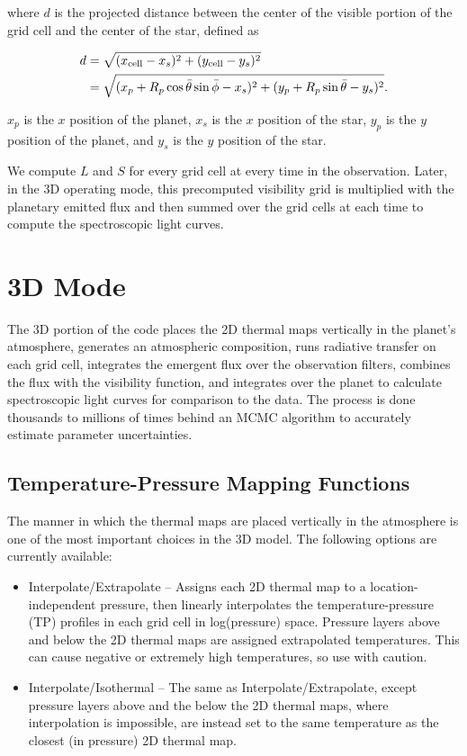 \documentclass[12pt]{article}
\begin{document}
\noindent
where $d$ is the projected distance between the center of the visible
portion of the grid cell and the center of the star, defined as

\begin{align}
  d &= \sqrt{(x_{\rm cell} - x_s)^2 + (y_{\rm cell} - y_s)^2} \\
  &= \sqrt{(x_p + R_p \cos\bar\theta\sin\bar\phi - x_s)^2 + (y_p + R_p \sin\bar\theta - y_s)^2}.
\end{align}

\noindent
$x_p$ is the $x$ position of the planet, $x_s$ is the $x$ position of the
star, $y_p$ is the $y$ position of the planet, and $y_s$ is the $y$
position of the star.

We compute $L$ and $S$ for every grid cell at every time in the
observation.  Later, in the 3D operating mode, this precomputed
visibility grid is multiplied with the planetary emitted flux and then
summed over the grid cells at each time to compute the spectroscopic
light curves.

\section{3D Mode}

The 3D portion of the code places the 2D thermal maps vertically
in the planet's atmosphere, generates an atmospheric composition,
runs radiative transfer on each grid cell, integrates the emergent
flux over the observation filters, combines the flux with the
visibility function, and integrates over the planet to calculate
spectroscopic light curves for comparison to the data. The process
is done thousands to millions of times behind an MCMC algorithm
to accurately estimate parameter uncertainties.

\subsection{Temperature-Pressure Mapping Functions}

The manner in which the thermal maps are placed vertically in the
atmosphere is one of the most important choices in the 3D model.
The following options are currently available:

\begin{itemize}
\item Interpolate/Extrapolate -- Assigns each 2D thermal map to a
  location-independent pressure, then linearly interpolates the
  temperature-pressure (TP) profiles in each grid cell in
  log(pressure) space. Pressure layers above and below the 2D thermal
  maps are assigned extrapolated temperatures. This can cause
  negative or extremely high temperatures, so use with caution.

\item Interpolate/Isothermal -- The same as Interpolate/Extrapolate,
  except pressure layers above and the below the 2D thermal maps,
  where interpolation is impossible, are instead set to the same
  temperature as the closest (in pressure) 2D thermal map.
\end{itemize}
\end{document}
